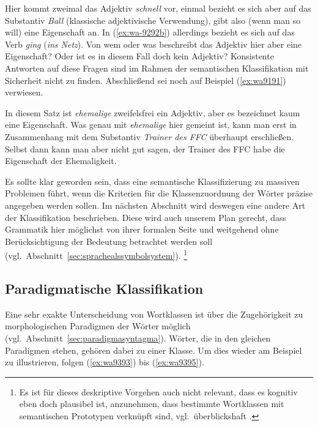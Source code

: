 
Hier kommt zweimal das Adjektiv \textit{schnell} vor, einmal bezieht es sich aber auf das Substantiv \textit{Ball} (klassische adjektivische Verwendung), gibt also (wenn man so will) eine Eigenschaft an.
In (\ref{ex:wa-9292b}) allerdings bezieht es sich auf das Verb \textit{ging} (\textit{ins Netz}).
Von wem oder was beschreibt das Adjektiv hier aber eine Eigenschaft?
Oder ist es in diesem Fall doch kein Adjektiv?
Konsistente Antworten auf diese Fragen sind im Rahmen der semantischen Klassifikation mit Sicherheit nicht zu finden.
Abschließend sei noch auf Beispiel (\ref{ex:wa9191}) verwiesen.

\begin{exe}
\end{exe}

In diesem Satz ist \textit{ehemalige} zweifelsfrei ein Adjektiv, aber es bezeichnet kaum eine Eigenschaft.
Was genau mit \textit{ehemalige} hier gemeint ist, kann man erst in Zusammenhang mit dem Substantiv \textit{Trainer des FFC} überhaupt erschließen.
Selbst dann kann man aber nicht gut sagen, der Trainer des FFC habe die Eigenschaft der Ehemaligkeit.

Es sollte klar geworden sein, dass eine semantische Klassifizierung zu massiven Problemen führt, wenn die Kriterien für die Klassenzuordnung der Wörter präzise angegeben werden sollen.
Im nächsten Abschnitt wird deswegen eine andere Art der Klassifikation beschrieben.
Diese wird auch unserem Plan gerecht, dass Grammatik hier möglichst von ihrer formalen Seite und weitgehend ohne Berücksichtigung der Bedeutung betrachtet werden soll (vgl.\ Abschnitt~\ref{sec:sprachealssymbolsystem}).%
\footnote{Es ist für dieses deskriptive Vorgehen auch nicht relevant, dass es kognitiv eben doch plausibel ist, anzunehmen, dass bestimmte Wortklassen mit semantischen Prototypen verknüpft sind, vgl.\ überblickshaft \citet{Croft2001}.}

\subsection{Paradigmatische Klassifikation}

\label{sec:paradigmatischeklassifikation}

Eine sehr exakte Unterscheidung von Wortklassen ist über die Zugehörigkeit zu morphologischen Paradigmen der Wörter möglich (vgl.\ Abschnitt~\ref{sec:paradigmasyntagma}).
Wörter, die in den gleichen Paradigmen stehen, gehören dabei zu einer Klasse.
Um dies wieder am Beispiel zu illustrieren, folgen (\ref{ex:wa9393}) bis (\ref{ex:wa9395}).

